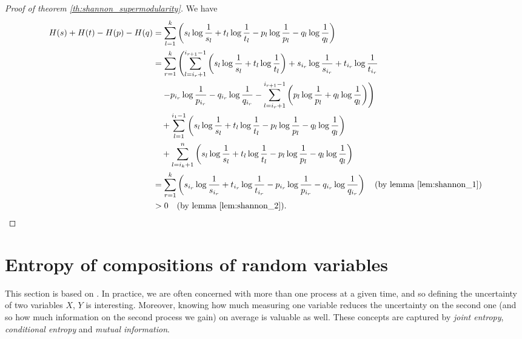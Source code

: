 \begin{proof}[Proof of theorem \ref{th:shannon_supermodularity}]
    We have
    \begin{align}
        H(s) + H(t) - H(p) - H(q)
        &= \sum_{l=1}^{k} \left( s_l \log \frac{1}{s_l} + t_l \log \frac{1}{t_l} - p_l \log \frac{1}{p_l} - q_l \log \frac{1}{q_l} \right) \\
        &= \sum_{r=1}^{k} \left( \sum_{l=i_r+1}^{i_{r+1}-1} \left( s_l \log \frac{1}{s_l} + t_l \log \frac{1}{t_l} \right)
        + s_{i_r} \log \frac{1}{s_{i_r}} + t_{i_r} \log \frac{1}{t_{i_r}} \right. \\
        &\quad \left. - p_{i_r} \log \frac{1}{p_{i_r}} - q_{i_r} \log \frac{1}{q_{i_r}} 
        - \sum_{l=i_r+1}^{i_{r+1}-1} \left( p_l \log \frac{1}{p_l} + q_l \log \frac{1}{q_l} \right) \right) \\
        &\quad + \sum_{l=1}^{i_1 - 1} \left( s_l \log \frac{1}{s_l} + t_l \log \frac{1}{t_l} 
        - p_l \log \frac{1}{p_l} - q_l \log \frac{1}{q_l} \right) \\
        &\quad + \sum_{l=i_k+1}^{n} \left( s_l \log \frac{1}{s_l} + t_l \log \frac{1}{t_l} 
        - p_l \log \frac{1}{p_l} - q_l \log \frac{1}{q_l} \right) \\
        &= \sum_{r=1}^{k} \left( s_{i_r} \log \frac{1}{s_{i_r}} + t_{i_r} \log \frac{1}{t_{i_r}} 
        - p_{i_r} \log \frac{1}{p_{i_r}} - q_{i_r} \log \frac{1}{q_{i_r}} \right) 
        \quad \text{(by lemma \ref{lem:shannon_1})} \\
        &> 0 \quad \text{(by lemma \ref{lem:shannon_2}).} \qedhere
    \end{align}
\end{proof}




\newpage

\section{Entropy of compositions of random variables} \label{app:shannon_compositions}

\setcounter{equation}{0}

This section is based on \cite[pp. 16--22]{cover_elements_2006}. In practice, we are often concerned with more than one process at a given time, and so defining the uncertainty of two variables $X$, $Y$ is interesting. Moreover, knowing how much measuring one variable reduces the uncertainty on the second one (and so how much information on the second process we gain) on average is valuable as well. These concepts are captured by \textit{joint entropy}, \textit{conditional entropy} and \textit{mutual information}.

